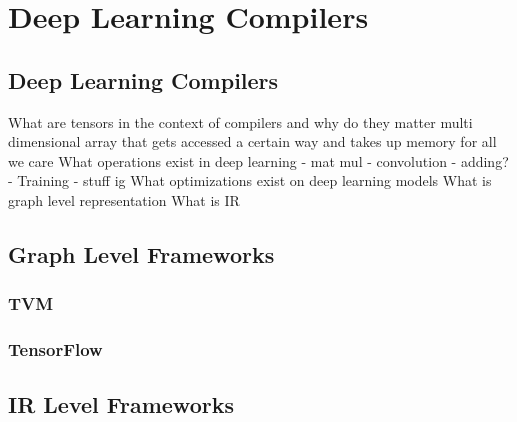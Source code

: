 
\chapter{Deep Learning Compilers} %

\label{Chapter2} %

\section{Deep Learning Compilers}

What are tensors in the context of compilers and why do they matter
	multi dimensional array that gets accessed a certain way and takes up memory for all we care
What operations exist in deep learning
- mat mul
- convolution
- adding?
- Training
- stuff ig
What optimizations exist on deep learning models
What is graph level representation
What is IR 



\section{Graph Level Frameworks}


\subsection{TVM}


\subsection{TensorFlow}


\section{IR Level Frameworks}



